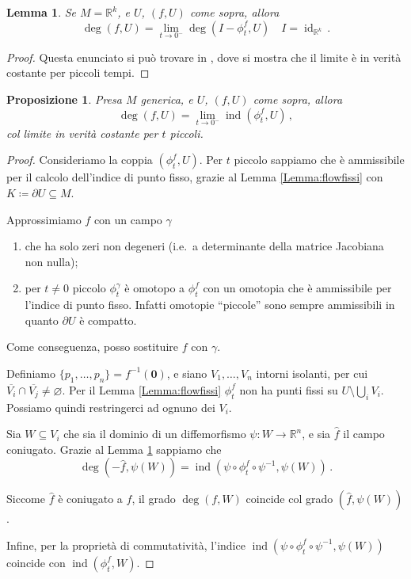 \documentclass[a4paper, 11pt]{article}
\theoremstyle{definition}
\theoremstyle{plain}
\newtheorem{Lemma}[Def]{Lemma}
\newtheorem{Prop}[Def]{Proposizione}
\newcommand{\zero}{\mathbf{0}}
\newcommand{\eset}{\varnothing}
\newcommand{\R}{\mathbb{R}}
\newcommand{\cl}[1]{\overline{#1}}
\newcommand{\deff}{\coloneqq}
\DeclareMathOperator{\id}{id}
\DeclareMathOperator{\ind}{ind}
\begin{document}
\begin{Lemma}\label{Lemma:degind}
	Se $M = \R^k$, e $U$, $(f,U)$ come sopra, allora
	\[
		\deg(f,U) = \lim_{t \to 0^-}\deg(I-\phi_t^f,U) \quad I = \id_{\R^k}\,.
	\]
\end{Lemma}
\begin{proof}
	Questa enunciato si può trovare in \cite[Prop. 3.3]{FuriPeraSpadini2000}, dove si mostra che il limite è in verità costante per piccoli tempi.
\end{proof}
\begin{Prop}
	Presa $M$ generica, e $U$, $(f,U)$ come sopra, allora
	\[
		\deg(f,U) = \lim_{t \to 0^-}\ind(\phi_t^f,U)\,,
	\]
	col limite in verità costante per $t$ piccoli.
\end{Prop}
\begin{proof}
	Consideriamo la coppia $(\phi_t^f,U)$. Per $t$ piccolo sappiamo che è ammissibile per il calcolo dell'indice di punto fisso, grazie al Lemma \ref{Lemma:flowfissi} con $K \deff \partial U \subseteq M$.

	Approssimiamo $f$ con un campo $\gamma$
	\begin{enumerate}
		\item che ha solo zeri non degeneri (i.e.\ a determinante della matrice Jacobiana non nulla);
		\item per $t \neq 0$ piccolo $\phi_t^\gamma$ è omotopo a $\phi_t^f$ con un omotopia che è ammissibile per l'indice di punto fisso. Infatti omotopie ``piccole'' sono sempre ammissibili in quanto $\partial U$ è compatto.
	\end{enumerate} 
	Come conseguenza, posso sostituire $f$ con $\gamma$. 
	
	Definiamo $\{p_1, \dots, p_n\} = f^{-1}(\zero)$, e siano $V_1, \dots, V_n$ intorni isolanti, per cui $\cl{V_i} \cap \cl{V_j} \neq \eset$. Per il Lemma \ref{Lemma:flowfissi} $\phi_t^f$ non ha punti fissi su $U \setminus \bigcup_iV_i$. Possiamo quindi restringerci ad ognuno dei $V_i$.
	
	Sia $W \subseteq V_i$ che sia il dominio di un diffemorfismo $\psi \colon W \to \R^n$, e sia $\hat{f}$ il campo coniugato. Grazie al Lemma \ref{Lemma:degind} sappiamo che
	\[
		\deg(-\hat{f}, \psi(W)) = \ind(\psi \circ \phi_t^f \circ \psi^{-1}, \psi(W))\,.
	\]
	
	Siccome $\hat{f}$ è coniugato a $f$, il grado $\deg(f,W)$ coincide col grado $(\hat{f}, \psi(W))$. 
	
	Infine, per la proprietà di commutatività, l'indice $\ind(\psi \circ \phi_t^f \circ \psi^{-1}, \psi(W))$ coincide con $\ind(\phi_t^f, W)$.
\end{proof}
\end{document}
